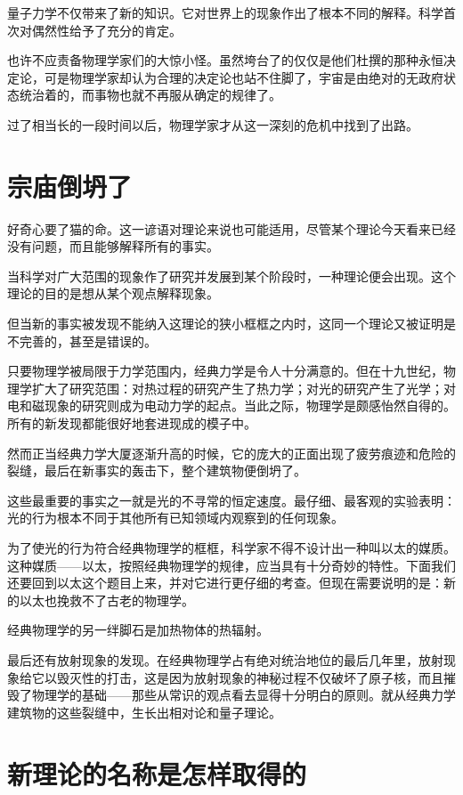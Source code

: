 量子力学不仅带来了新的知识。它对世界上的现象作出了根本不同的解释。科学首次对偶然性给予了充分的肯定。

也许不应责备物理学家们的大惊小怪。虽然垮台了的仅仅是他们杜撰的那种永恒决定论，可是物理学家却认为合理的决定论也站不住脚了，宇宙是由绝对的无政府状态统治着的，而事物也就不再服从确定的规律了。

过了相当长的一段时间以后，物理学家才从这一深刻的危机中找到了出路。

\section{宗庙倒坍了}

好奇心要了猫的命。这一谚语对理论来说也可能适用，尽管某个理论今天看来已经没有问题，而且能够解释所有的事实。

当科学对广大范围的现象作了研究并发展到某个阶段时，一种理论便会出现。这个理论的目的是想从某个观点解释现象。

但当新的事实被发现不能纳入这理论的狭小框框之内时，这同一个理论又被证明是不完善的，甚至是错误的。

只要物理学被局限于力学范围内，经典力学是令人十分满意的。但在十九世纪，物理学扩大了研究范围：对热过程的研究产生了热力学；对光的研究产生了光学；对电和磁现象的研究则成为电动力学的起点。当此之际，物理学是颇感怡然自得的。所有的新发现都能很好地套进现成的模子中。

然而正当经典力学大厦逐渐升高的时候，它的庞大的正面出现了疲劳痕迹和危险的裂缝，最后在新事实的轰击下，整个建筑物便倒坍了。

这些最重要的事实之一就是光的不寻常的恒定速度。最仔细、最客观的实验表明：光的行为根本不同于其他所有已知领域内观察到的任何现象。

为了使光的行为符合经典物理学的框框，科学家不得不设计出一种叫以太的媒质。这种媒质——以太，按照经典物理学的规律，应当具有十分奇妙的特性。下面我们还要回到以太这个题目上来，并对它进行更仔细的考查。但现在需要说明的是：新的以太也挽救不了古老的物理学。

经典物理学的另一绊脚石是加热物体的热辐射。

最后还有放射现象的发现。在经典物理学占有绝对统治地位的最后几年里，放射现象给它以毁灭性的打击，这是因为放射现象的神秘过程不仅破坏了原子核，而且摧毁了物理学的基础——那些从常识的观点看去显得十分明白的原则。就从经典力学建筑物的这些裂缝中，生长出相对论和量子理论。

\section{新理论的名称是怎样取得的}

